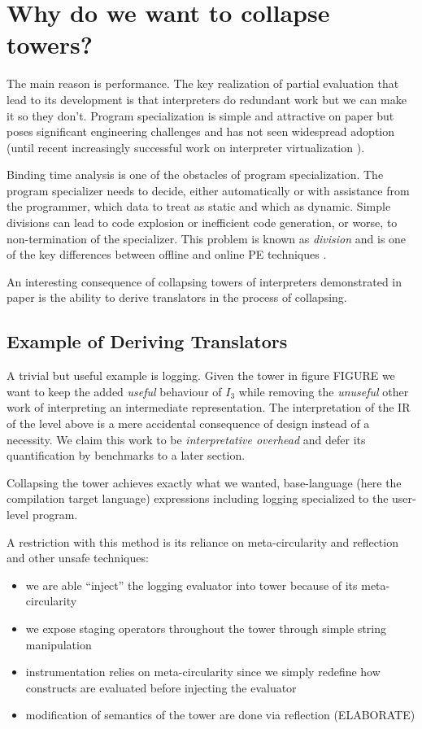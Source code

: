 \documentclass{article}
\theoremstyle{definition}
\begin{document}
\section{Why do we want to collapse towers?}
The main reason is performance. The key realization of partial evaluation that lead to its development is that interpreters do redundant work but we can make it so they don't. Program specialization is simple and attractive on paper but poses significant engineering challenges and has not seen widespread adoption (until recent increasingly successful work on interpreter virtualization \cite{wurthinger2013one}).

Binding time analysis is one of the obstacles of program specialization. The program specializer needs to decide, either automatically or with assistance from the programmer, which data to treat as static and which as dynamic. Simple divisions
can lead to code explosion or inefficient code generation, or worse, to non-termination of the specializer. This problem is known as \textit{division} and is one of the key differences between offline and online PE techniques \cite{jones1993partial}.

An interesting consequence of collapsing towers of interpreters demonstrated in \cite{amin2017collapsing} paper is the ability to derive translators in the process of collapsing.

\subsection{Example of Deriving Translators}
A trivial but useful example is logging. Given the tower in figure FIGURE we want to keep the added \textit{useful} behaviour of $I_3$ while removing the \textit{unuseful} other work of interpreting an intermediate representation. The interpretation
of the IR of the level above is a mere accidental consequence of design instead of a necessity. We claim this work to be \textit{interpretative overhead} and defer its quantification by benchmarks to a later section.

Collapsing the tower achieves exactly what we wanted, base-language (here the compilation target language) expressions including logging specialized to the user-level program.

A restriction with this method is its reliance on meta-circularity and reflection and other unsafe techniques:
\begin{itemize}
	\item we are able ``inject'' the logging evaluator into tower because of its meta-circularity
	\item we expose staging operators throughout the tower through simple string manipulation
	\item instrumentation relies on meta-circularity since we simply redefine how constructs are evaluated before injecting the evaluator
	\item modification of semantics of the tower are done via reflection (ELABORATE)
\end{itemize}
\end{document}
